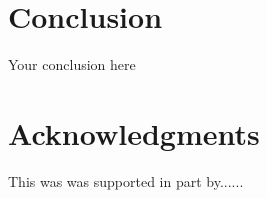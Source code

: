 \documentclass{article}
\begin{document}


\section{Conclusion}
Your conclusion here

\section*{Acknowledgments}
This was was supported in part by......

  
  
\end{document}
